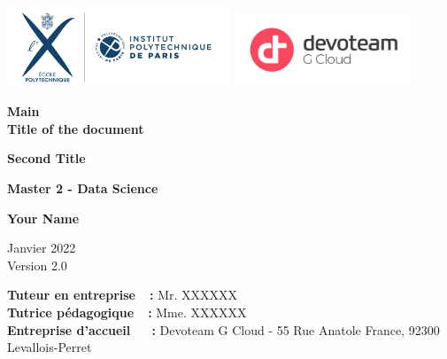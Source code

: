 \documentclass[11pt, oneside]{article}
\begin{document}
\begin{titlepage}
    \includegraphics[width=0.5\textwidth]{images/ipparis_logo.png}
    \hspace{0.7cm}
    \includegraphics[width=0.4\textwidth]{images/devoteam_gcloud_logo.png}

    \begin{center}
        \vspace{3cm}        
        \Huge{\textbf{Main \\ Title of the document}}
        
        \vspace{0.5cm}
        \Large{\textbf{Second Title}}
        
        \vspace{2.5cm}
        \Large{\textbf{Master 2 - Data Science}}
            
        \vspace{1.5cm}
        \Large{\textbf{Your Name}}
        
        \vspace{0.5cm}    
        \large{Janvier 2022} \\
        \large{Version 2.0}

    \end{center}

    \vfill
    
    \noindent
    \textbf{Tuteur en entreprise\ \ :} Mr. XXXXXX \\
    \textbf{Tutrice pédagogique\ \  :} Mme. XXXXXX \\
    \textbf{Entreprise d'accueil\ \ \ :} Devoteam G Cloud - 55 Rue Anatole France, 92300 Levallois-Perret
    
    \vspace{1cm}  
        
\end{titlepage}

\vspace*{2cm}
\renewcommand{\contentsname}{Table of contents}
\tableofcontents
\newpage
\end{document}
